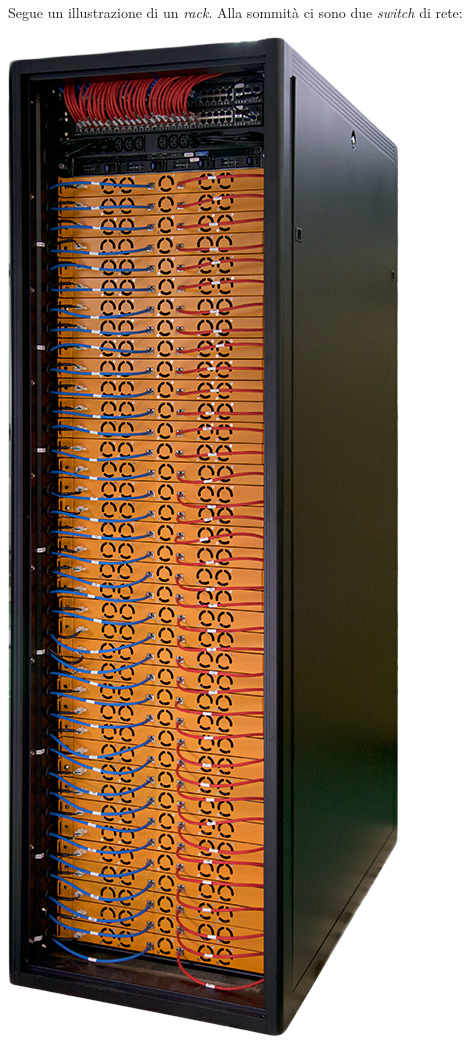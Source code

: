 Segue un illustrazione di un \textit{rack}. Alla sommit\`{a} ci sono due \textit{switch} di rete:

\begin{center}
\includegraphics[scale=0.30]{img/rack.png}
\end{center}
